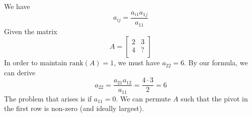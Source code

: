 \documentclass[a4paper]{article}
\begin{document}
We have
\[
	a_{ij} = \frac{a_{i1}a_{1j}}{a_{11}}
\]
Given the matrix
\[
	A = 
	\begin{bmatrix}
		2 & 3 \\
		4 & ? \\
	\end{bmatrix}
\]
In order to maintain \(\text{rank}\!\left( A \right) = 1\), we must have \(a_{22} = 6\). By our formula, we can derive
\[
	a_{22} = \frac{a_{21} a_{12}}{a_{11}} = \frac{4 \cdot 3}{2} = 6
\]
The problem that arises is if \(a_{11} = 0\). We can permute \(A\) such that the pivot in the first row is non-zero (and ideally largest).

\vspace{12pt}

\end{document}
